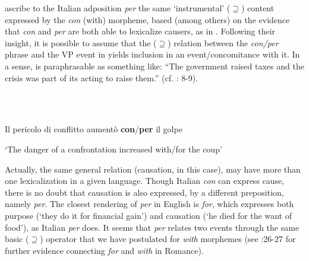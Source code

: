 \documentclass[output=paper]{langsci/langscibook}
\begin{document}
\citet{FrancoManzini2017b} ascribe to the Italian adposition \textit{per} the same ‘instrumental’ (${\supseteq}$) content expressed by the \textit{con} (with) morpheme, based (among others) on the evidence that \textit{con} and \textit{per} are both able to lexicalize causers, as in . Following their insight, it is possible to assume that the (${\supseteq}$) relation between the \textit{con/per} phrase and the VP event in  yields inclusion in an event/concomitance with it. In a sense,  is paraphrasable as something like: “The government raised taxes and the crisis was part of its acting to raise them.” (cf. \citealt{FrancoManzini2017b}: 8-9).

\ea%
    \label{ex:key:24}
    \gll\\
        \\
    \glt
    \z

          Il pericolo di conflitto aumentò \textbf{con}/\textbf{per} il golpe

  ‘The danger of a confrontation increased with/for the coup’

Actually, the same general relation (causation, in this case), may have more than one lexicalization in a given language. Though Italian \textit{con} can express cause, there is no doubt that causation is also expressed, by a different preposition, namely \textit{per}. The closest rendering of \textit{per} in English is \textit{for}, which expresses both purpose (‘they do it for financial gain’) and causation (‘he died for the want of food’), as Italian \textit{per} does. It seems that \textit{per} relates two events through the same basic (${\supseteq}$) operator that we have postulated for \textit{with} morphemes (see \citealt{FrancoManzini2017b}:26-27 for further evidence connecting \textit{for} and \textit{with} in Romance).
\end{document}
